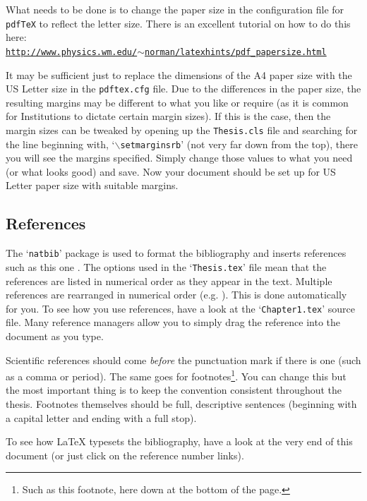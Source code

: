 What needs to be done is to change the paper size in the configuration file for \texttt{pdfTeX} to reflect the letter size. There is an excellent tutorial on how to do this here: \\
\href{http://www.physics.wm.edu/~norman/latexhints/pdf_papersize.html}{\texttt{http://www.physics.wm.edu/$\sim$norman/latexhints/pdf\_papersize.html}}

It may be sufficient just to replace the dimensions of the A4 paper size with the US Letter size in the \texttt{pdftex.cfg} file. Due to the differences in the paper size, the resulting margins may be different to what you like or require (as it is common for Institutions to dictate certain margin sizes). If this is the case, then the margin sizes can be tweaked by opening up the \texttt{Thesis.cls} file and searching for the line beginning with, `$\backslash$\texttt{setmarginsrb}' (not very far down from the top), there you will see the margins specified. Simply change those values to what you need (or what looks good) and save. Now your document should be set up for US Letter paper size with suitable margins.

\subsection{References}

The `\texttt{natbib}' package is used to format the bibliography and inserts references such as this one \cite{cmu-malware}. The options used in the `\texttt{Thesis.tex}' file mean that the references are listed in numerical order as they appear in the text. Multiple references are rearranged in numerical order (e.g. \cite{kendall2007practical}). This is done automatically for you. To see how you use references, have a look at the `\texttt{Chapter1.tex}' source file. Many reference managers allow you to simply drag the reference into the document as you type.

Scientific references should come \emph{before} the punctuation mark if there is one (such as a comma or period). The same goes for footnotes\footnote{Such as this footnote, here down at the bottom of the page.}. You can change this but the most important thing is to keep the convention consistent throughout the thesis. Footnotes themselves should be full, descriptive sentences (beginning with a capital letter and ending with a full stop).

To see how \LaTeX{} typesets the bibliography, have a look at the very end of this document (or just click on the reference number links).

